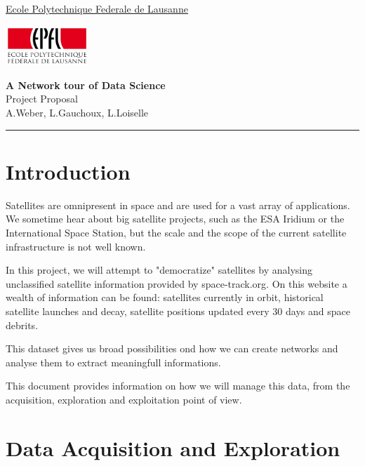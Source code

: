 \documentclass[11pt,letterpaper]{article}
\begin{document}
\pagestyle{plain}
\begin{flushleft}
\underline{Ecole Polytechnique Federale de Lausanne} \hfill
\end{flushleft}

\begin{flushright}\vspace{-5mm}
\includegraphics[height=1.5cm]{logo.png}
\end{flushright}
 
\begin{center}\vspace{-1cm}
\textbf{\large A Network tour of Data Science}\\
Project Proposal\\
A.Weber, L.Gauchoux, L.Loiselle
\end{center}

 
\rule{\linewidth}{0.1mm}

\section{Introduction}

Satellites are omnipresent in space and are used for a vast array of applications.
We sometime hear about big satellite projects, such as the ESA Iridium or the International Space Station, but the scale and
the scope of the current satellite infrastructure is not well known.

In this project, we will attempt to "democratize" satellites by analysing unclassified satellite information provided by 
space-track.org.
On this website a wealth of information can be found: satellites currently in orbit, historical satellite launches and decay, satellite positions updated every 30 days and space debrits.

This dataset gives us broad possibilities ond how we can create networks and analyse them to extract meaningfull informations.

This document provides information on how we will manage this data, from the acquisition, exploration and exploitation point of view.

\section{Data Acquisition and Exploration}
\end{document}
